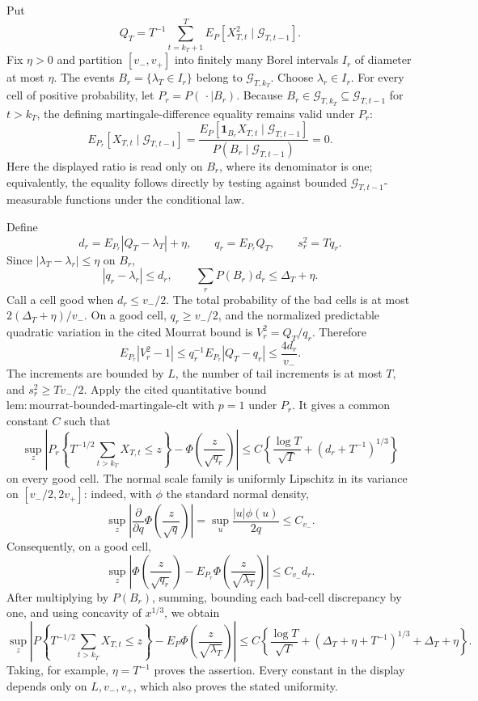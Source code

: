 Put
\[
 Q_T=T^{-1}\sum_{t=k_T+1}^T E_P[X_{T,t}^2\mid\mathcal G_{T,t-1}].
\]
Fix \(\eta>0\) and partition \([v_-,v_+]\) into finitely many Borel intervals \(I_r\) of diameter at most \(\eta\). The events \(B_r=\{\lambda_T\in I_r\}\) belong to \(\mathcal G_{T,k_T}\). Choose \(\lambda_r\in I_r\). For every cell of positive probability, let \(P_r=P(\,\cdot\mid B_r)\). Because \(B_r\in\mathcal G_{T,k_T}\subseteq\mathcal G_{T,t-1}\) for \(t>k_T\), the defining martingale-difference equality remains valid under \(P_r\):
\[
 E_{P_r}[X_{T,t}\mid\mathcal G_{T,t-1}]
 =\frac{E_P[\mathbf 1_{B_r}X_{T,t}\mid\mathcal G_{T,t-1}]}{P(B_r\mid\mathcal G_{T,t-1})}=0.
\]
Here the displayed ratio is read only on \(B_r\), where its denominator is one; equivalently, the equality follows directly by testing against bounded \(\mathcal G_{T,t-1}\)-measurable functions under the conditional law.

Define
\[
 d_r=E_{P_r}|Q_T-\lambda_T|+\eta,
 \qquad q_r=E_{P_r}Q_T,
 \qquad s_r^2=Tq_r.
\]
Since \(|\lambda_T-\lambda_r|\le\eta\) on \(B_r\),
\[
 |q_r-\lambda_r|\le d_r,
 \qquad
 \sum_rP(B_r)d_r\le\Delta_T+\eta.
\]
Call a cell good when \(d_r\le v_-/2\). The total probability of the bad cells is at most \(2(\Delta_T+\eta)/v_-\). On a good cell, \(q_r\ge v_-/2\), and the normalized predictable quadratic variation in the cited Mourrat bound is \(V_r^2=Q_T/q_r\). Therefore
\[
 E_{P_r}|V_r^2-1|
 \le q_r^{-1}E_{P_r}|Q_T-q_r|
 \le \frac{4d_r}{v_-}.
\]
The increments are bounded by \(L\), the number of tail increments is at most \(T\), and \(s_r^2\ge Tv_-/2\). Apply the cited quantitative bound \(\mathrm{lem:mourrat\text{-}bounded\text{-}martingale\text{-}clt}\) with \(p=1\) under \(P_r\). It gives a common constant \(C\) such that
\[
 \sup_z\left|P_r\left\{T^{-1/2}\sum_{t>k_T}X_{T,t}\le z\right\}
 -\Phi\left(\frac z{\sqrt{q_r}}\right)\right|
 \le C\left\{\frac{\log T}{\sqrt T}+\left(d_r+T^{-1}\right)^{1/3}\right\}
\]
on every good cell. The normal scale family is uniformly Lipschitz in its variance on \([v_-/2,2v_+]\): indeed, with \(\phi\) the standard normal density,
\[
 \sup_z\left|\frac{\partial}{\partial q}\Phi\left(\frac z{\sqrt q}\right)\right|
 =\sup_u\frac{|u|\phi(u)}{2q}\le C_{v_-}.
\]
Consequently, on a good cell,
\[
 \sup_z\left|\Phi\left(\frac z{\sqrt{q_r}}\right)
 -E_{P_r}\Phi\left(\frac z{\sqrt{\lambda_T}}\right)\right|
 \le C_{v_-}d_r.
\]
After multiplying by \(P(B_r)\), summing, bounding each bad-cell discrepancy by one, and using concavity of \(x^{1/3}\), we obtain
\[
 \sup_z\left|P\left\{T^{-1/2}\sum_{t>k_T}X_{T,t}\le z\right\}
 -E_P\Phi\left(\frac z{\sqrt{\lambda_T}}\right)\right|
 \le C\left\{\frac{\log T}{\sqrt T}+\left(\Delta_T+\eta+T^{-1}\right)^{1/3}
 +\Delta_T+\eta\right\}.
\]
Taking, for example, \(\eta=T^{-1}\) proves the assertion. Every constant in the display depends only on \(L,v_-,v_+\), which also proves the stated uniformity.
